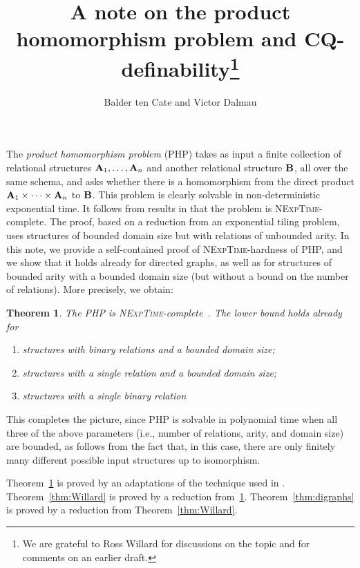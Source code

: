 \documentclass{article}
\makeatletter
\newtheorem{theorem}{Theorem}
\newcommand{\aest}{{\bf A}}
\newcommand{\best}{{\bf B}}
\newcommand{\nexptime}{\textsc{NExpTime}\xspace}
\newcommand{\manuallabel}[2]{\def\@currentlabel{#2}\label{#1}}
\makeatother
\begin{document}
\title{A note on the product homomorphism problem and CQ-definability\thanks{We are grateful to Ross Willard for discussions on the topic
  and 
  for comments on an earlier draft.}}

\author{Balder ten Cate and Victor Dalmau}

\maketitle
 
The \emph{product homomorphism problem} (PHP) takes as input a finite
collection of relational structures $\aest_1, \ldots, \aest_n$ and another
relational structure $\best$, all over the same schema, and asks whether
there is a homomorphism from the direct product $\aest_1\times\cdots
\times \aest_n$ to $\best$. This problem is clearly solvable in
non-deterministic exponential time. It follows from results in
\cite{Willard10} that the problem is \nexptime-complete. The proof,
based on a reduction from an exponential tiling problem, uses
structures of bounded domain size but with 
relations of unbounded arity.  In this note, we provide a
self-contained proof of \nexptime-hardness of PHP,
and we show that it holds already for directed
graphs, as well as for structures of
bounded arity with a bounded domain size (but without a bound on the
number of relations). More precisely, we obtain:

\begin{theorem}
  \manuallabel{thm:binary}{\thetheorem.1}
  \manuallabel{thm:Willard}{\thetheorem.2}
  \manuallabel{thm:digraphs}{\thetheorem.3}
The PHP is \nexptime-complete~\cite{Willard10}. The lower bound
holds already for
\begin{enumerate}
\item structures with binary relations and a bounded domain size;
\item structures with a single relation and a bounded domain size;
\item structures with a single binary relation
\end{enumerate}
\end{theorem}
This completes the picture, since PHP is solvable in polynomial time when all three of the
above parameters (i.e., number of relations, arity, and domain size) are bounded, as follows from the fact that, in this case, there are only finitely
many different possible input structures up to isomorphism. 

 Theorem~\ref{thm:binary} is proved by an adaptations of the technique
used in \cite{Willard10}. Theorem~\ref{thm:Willard} is proved by a
reduction
from~\ref{thm:binary}. Theorem~\ref{thm:digraphs} is proved
by a reduction 
from 
Theorem~\ref{thm:Willard}.
\end{document}
